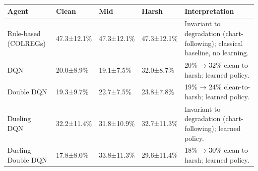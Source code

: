 \begin{tabular}{lllll}
\toprule
Agent & Clean & Mid & Harsh & Interpretation \\
\midrule
Rule-based (COLREGs) & 47.3±12.1\% & 47.3±12.1\% & 47.3±12.1\% & Invariant to degradation (chart-following); classical baseline, no learning. \\
DQN & 20.0±8.9\% & 19.1±7.5\% & 32.0±8.7\% & 20\% → 32\% clean-to-harsh; learned policy. \\
Double DQN & 19.3±9.7\% & 22.7±7.5\% & 23.8±7.8\% & 19\% → 24\% clean-to-harsh; learned policy. \\
Dueling DQN & 32.2±11.4\% & 31.8±10.9\% & 32.7±11.3\% & Invariant to degradation (chart-following); learned policy. \\
Dueling Double DQN & 17.8±8.0\% & 33.8±11.3\% & 29.6±11.4\% & 18\% → 30\% clean-to-harsh; learned policy. \\
\bottomrule
\end{tabular}
